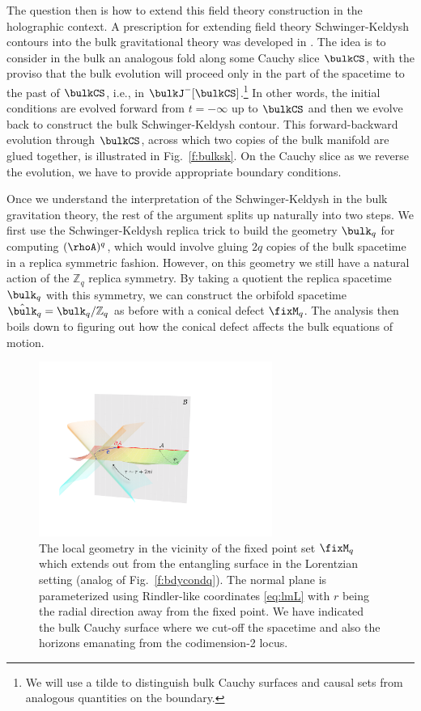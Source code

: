 \documentclass[12pt,openany]{book}
\begin{document}
The question then is how to extend this field theory construction in the holographic context. A prescription for extending field theory Schwinger-Keldysh contours into the bulk gravitational theory was developed in
\cite{Skenderis:2008dh,Skenderis:2008dg}. The idea is to consider in the bulk an analogous fold along some Cauchy slice $\bulkCS$, with the proviso that the bulk evolution will proceed only in the part of the spacetime to the past of $\bulkCS$, i.e., in $\bulkJ^-[\bulkCS]$.\footnote{ We will use a tilde to distinguish bulk Cauchy surfaces and causal sets  from analogous quantities on the boundary.} In other words, the initial conditions are evolved forward from $t=-\infty$ up to $\bulkCS$ and then we evolve back to construct the bulk Schwinger-Keldysh contour. This forward-backward evolution through $\bulkCS$, across which two copies of the bulk manifold are glued together, is illustrated in Fig.~\ref{f:bulksk}. On the Cauchy slice as we reverse the evolution,  we have to provide appropriate boundary conditions.

Once we understand the interpretation of the Schwinger-Keldysh in the bulk gravitation theory, the rest of the argument splits up naturally into two steps. We first use the Schwinger-Keldysh replica trick to build the geometry $\bulk_q$ for computing $(\rhoA)^q$, which would involve gluing $2q$ copies of the bulk spacetime in a replica symmetric fashion. However, on this geometry we still have a natural action of the ${\mathbb Z}_q$ replica symmetry. By taking a quotient the replica spacetime $\bulk_q$ with this symmetry, we can  construct the orbifold spacetime $\hat{\bulk}_q = \bulk_q/{\mathbb Z}_q$ as before with a conical defect $\fixM_q$. The analysis then boils down to figuring out how the conical defect affects the bulk equations of motion.

\begin{figure}[htbp]
\begin{center}
\includegraphics[width=3in]{figures/normaleqM}
\caption{The local geometry in the vicinity of the fixed point set $\fixM_q$  which extends out from the entangling surface
in the Lorentzian setting (analog of Fig.~\ref{f:bdycondq}). The normal plane is parameterized using Rindler-like coordinates
 \eqref{eq:lmL} with $r$ being the radial direction away from the fixed point. We have indicated the bulk Cauchy surface where we cut-off the spacetime and also the horizons emanating from the codimension-2 locus.
}
\label{f:bdycondqM}
\end{center}
\end{figure}
%
\end{document}
